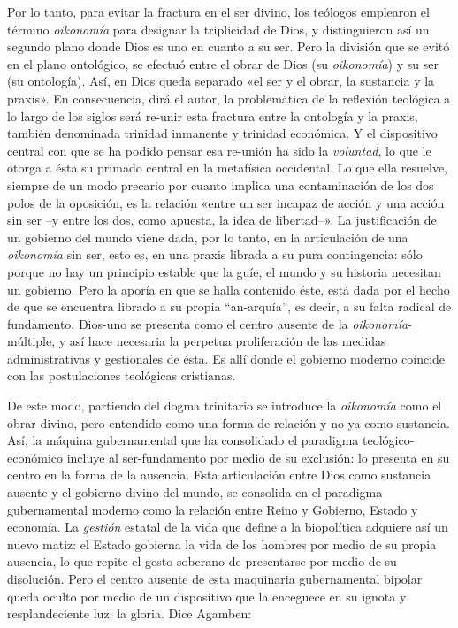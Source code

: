 Por lo tanto, para evitar la fractura en el ser divino, los teólogos emplearon el término \emph{oikonomía} para designar la triplicidad de Dios, y distinguieron así un segundo plano donde Dios es uno en cuanto a su ser. Pero la división que se evitó en el plano ontológico, se efectuó entre el obrar de Dios (su \emph{oikonomía}) y su ser (su ontología). Así, en Dios queda separado «el ser y el obrar, la sustancia y la praxis». En consecuencia, dirá el autor, la problemática de la reflexión teológica a lo largo de los siglos será re-unir esta fractura entre la ontología y la praxis, también denominada trinidad inmanente y trinidad económica. Y el dispositivo central con que se ha podido pensar esa re-unión ha sido la \emph{voluntad}, lo que le otorga a ésta su primado central en la metafísica occidental. Lo que ella resuelve, siempre de un modo precario por cuanto implica una contaminación de los dos polos de la oposición, es la relación «entre un ser incapaz de acción y una acción sin ser --y entre los dos, como apuesta, la idea de libertad--». La justificación de un gobierno del mundo viene dada, por lo tanto, en la articulación de una \emph{oikonomía }sin ser, esto es, en una praxis librada a su pura contingencia: sólo porque no hay un principio estable que la guíe, el mundo y su historia necesitan un gobierno. Pero la aporía en que se halla contenido éste, está dada por el hecho de que se encuentra librado a su propia ``an-arquía'', es decir, a su falta radical de fundamento. Dios-uno se presenta como el centro ausente de la \emph{oikonomía}-múltiple, y así hace necesaria la perpetua proliferación de las medidas administrativas y gestionales de ésta. Es allí donde el gobierno moderno coincide con las postulaciones teológicas cristianas.

De este modo, partiendo del dogma trinitario se introduce la \emph{oikonomía }como el obrar divino, pero entendido como una forma de relación y no ya como sustancia. Así, la máquina gubernamental que ha consolidado el paradigma teológico-económico incluye al ser-fundamento por medio de su exclusión: lo presenta en su centro en la forma de la ausencia. Esta articulación entre Dios como sustancia ausente y el gobierno divino del mundo, se consolida en el paradigma gubernamental moderno como la relación entre Reino y Gobierno, Estado y economía. La \emph{gestión} estatal de la vida que define a la biopolítica adquiere así un nuevo matiz: el Estado gobierna la vida de los hombres por medio de su propia ausencia, lo que repite el gesto soberano de presentarse por medio de su disolución. Pero el centro ausente de esta maquinaria gubernamental bipolar queda oculto por medio de un dispositivo que la enceguece en su ignota y resplandeciente luz: la gloria. Dice Agamben:

